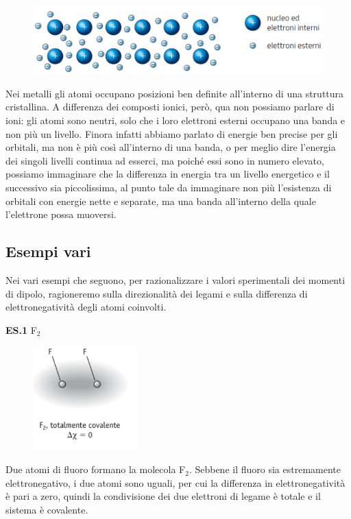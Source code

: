 \begin{figure}[htp]
    \centering
    \includegraphics[width=14cm]{immagini/legame-metallico.png}
\end{figure}

Nei metalli gli atomi occupano posizioni ben definite all'interno di una struttura cristallina. A differenza dei composti ionici, però, qua non possiamo parlare di ioni: gli atomi sono neutri, solo che i loro elettroni esterni occupano una banda e non più un livello. Finora infatti abbiamo parlato di energie ben precise per gli orbitali, ma non è più così all'interno di una banda, o per meglio dire l'energia dei singoli livelli continua ad esserci, ma poiché essi sono in numero elevato, possiamo immaginare che la differenza in energia tra un livello energetico e il successivo sia piccolissima, al punto tale da immaginare non più l'esistenza di orbitali con energie nette e separate, ma una banda all'interno della quale l'elettrone possa muoversi.

\subsection{Esempi vari}
Nei vari esempi che seguono, per razionalizzare i valori sperimentali dei momenti di dipolo, ragioneremo sulla direzionalità dei legami e sulla differenza di elettronegatività degli atomi coinvolti.

\vspace{0.2cm}\textbf{ES.1} F$_2$

\begin{figure}[htp]
    \centering
    \includegraphics[width=4cm]{immagini/F_2.png}
\end{figure}

Due atomi di fluoro formano la molecola F$_2$. Sebbene il fluoro sia estremamente elettronegativo, i due atomi sono uguali, per cui la differenza in elettronegatività è pari a zero, quindi la condivisione dei due elettroni di legame è totale e il sistema è covalente.

